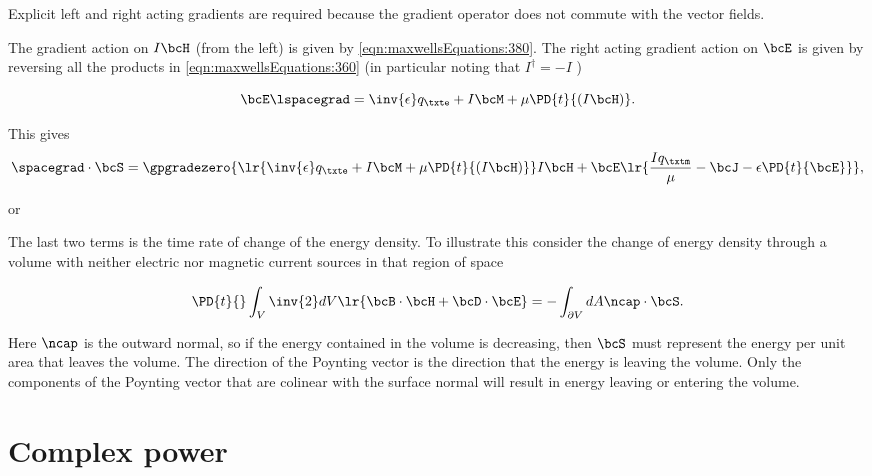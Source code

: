 Explicit left and right acting gradients are required because the gradient operator does not commute with the vector fields.

The gradient action on \( I \bcH \) (from the left) is given by
\cref{eqn:maxwellsEquations:380}.  The right acting gradient action on \( \bcE \) is given by reversing all the products in
\cref{eqn:maxwellsEquations:360} (in particular noting that \( I^\dagger = -I \) )

\begin{dmath}\label{eqn:maxwellsEquations:660}
\bcE \lspacegrad = \inv{\epsilon} q_\txte + I \bcM + \mu \PD{t}{(I\bcH)}.
\end{dmath}

This gives
\begin{dmath}\label{eqn:maxwellsEquations:680}
\spacegrad \cdot \bcS
=
\gpgradezero
{
\lr{ \inv{\epsilon} q_\txte + I \bcM + \mu \PD{t}{(I\bcH)} } I \bcH
+
\bcE
\lr
{
\frac{I q_\txtm}{\mu} - \bcJ - \epsilon \PD{t}{\bcE}
}
}
,
\end{dmath}

or

The last two terms is the time rate of change of the energy density.  To illustrate this consider the change of energy density through a volume with neither electric nor magnetic current sources in that region of space

\begin{dmath}\label{eqn:maxwellsEquations:740}
\PD{t}{} \int_V
\inv{2} dV \lr{
\bcB \cdot \bcH
+ \bcD \cdot \bcE
}
=
-\int_{\partial V} dA \ncap \cdot \bcS.
\end{dmath}

Here \( \ncap \) is the outward normal, so if the energy contained in the volume is decreasing, then \( \bcS \) must represent the energy per unit area that leaves the volume.  The direction of the Poynting vector is the direction that the energy is leaving the volume.  Only the components of the Poynting vector that are colinear with the surface normal will result in energy leaving or entering the volume.

\section{Complex power}

